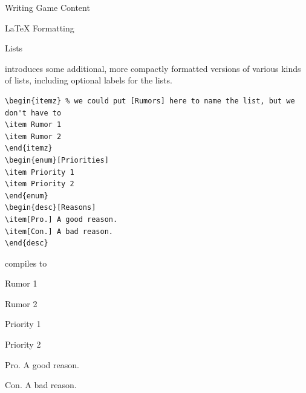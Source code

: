 \documentclass[sheet]{GameTexBase}
\begin{document}
\begin{section}{Writing Game Content}
\begin{subsection}{\LaTeX{} Formatting}
\begin{subsubsection}{\gametex{} Lists}

\gametex{} introduces some additional, more compactly formatted versions of various kinds of lists, including optional labels for the lists.

\begin{verbatim}
\begin{itemz} % we could put [Rumors] here to name the list, but we don't have to
\item Rumor 1
\item Rumor 2
\end{itemz}
\begin{enum}[Priorities]
\item Priority 1
\item Priority 2
\end{enum}
\begin{desc}[Reasons]
\item[Pro.] A good reason.
\item[Con.] A bad reason.
\end{desc}
\end{verbatim}
compiles to 

\begin{itemz} %
\item Rumor 1
\item Rumor 2
\end{itemz}
\begin{enum}[Priorities]
\item Priority 1
\item Priority 2
\end{enum}
\begin{desc}[Reasons]
\item[Pro.] A good reason.
\item[Con.] A bad reason.
\end{desc}
\end{subsubsection}
\end{subsection}
\end{section}
\end{document}
